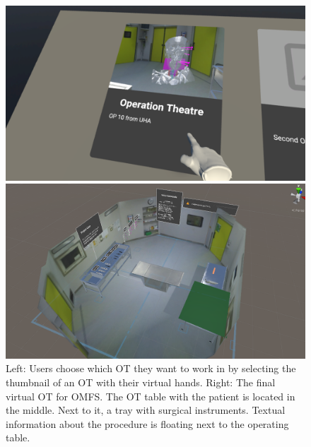 \begin{figure}[ht]
  \centering
  \begin{minipage}{.5\textwidth}
    \centering
    \includegraphics[width=0.99\linewidth]{images/implementation/vot/select_op.png}
  \end{minipage}%
  \begin{minipage}{.5\textwidth}
    \centering
    \includegraphics[width=0.99\linewidth]{images/implementation/vot/overview.png}
  \end{minipage}
  \caption{\label{fig::SceneSelect} Left: Users choose which OT they want to work in by selecting the thumbnail of an OT with their virtual hands. Right: The final virtual OT for OMFS. 
  The OT table with the patient is located in the middle. Next to it, a tray with surgical instruments.
  Textual information about the procedure is floating next to the operating table.}
\end{figure}

